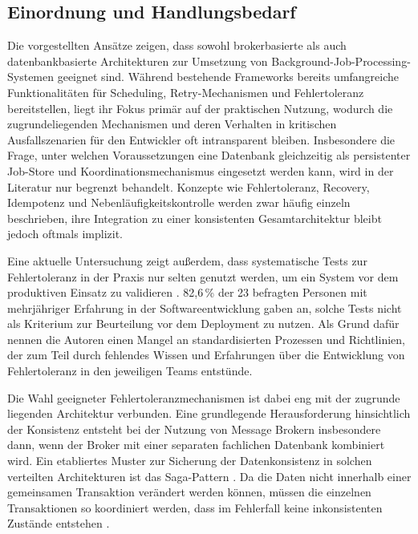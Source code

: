 \subsection{Einordnung und Handlungsbedarf}
\label{subsec:forschungsluecke}
Die vorgestellten Ansätze zeigen, dass sowohl brokerbasierte als auch datenbankbasierte Architekturen zur Umsetzung von
Background-Job-Processing-Systemen geeignet sind.
Während bestehende Frameworks bereits umfangreiche Funktionalitäten für Scheduling, Retry-Mechanismen und Fehlertoleranz
bereitstellen, liegt ihr Fokus primär auf der praktischen Nutzung, wodurch die zugrundeliegenden Mechanismen
und deren Verhalten in kritischen Ausfallszenarien für den Entwickler oft intransparent bleiben.
Insbesondere die Frage, unter welchen Voraussetzungen eine Datenbank gleichzeitig als persistenter Job-Store und
Koordinationsmechanismus eingesetzt werden kann, wird in der Literatur nur begrenzt behandelt.
Konzepte wie Fehlertoleranz, Recovery, Idempotenz und Nebenläufigkeitskontrolle werden zwar häufig einzeln beschrieben,
ihre Integration zu einer konsistenten Gesamtarchitektur bleibt jedoch oftmals implizit.

Eine aktuelle Untersuchung zeigt außerdem, dass systematische Tests zur Fehlertoleranz in der Praxis nur selten genutzt werden,
um ein System vor dem produktiven Einsatz zu validieren \parencite{miranda_proposed_2024}.
82,6\,\% der 23 befragten Personen mit mehrjähriger Erfahrung in der Softwareentwicklung gaben an, solche Tests nicht als
Kriterium zur Beurteilung vor dem Deployment zu nutzen.
Als Grund dafür nennen die Autoren einen Mangel an standardisierten Prozessen und Richtlinien, der zum Teil durch fehlendes
Wissen und Erfahrungen über die Entwicklung von Fehlertoleranz in den jeweiligen Teams entstünde.

Die Wahl geeigneter Fehlertoleranzmechanismen ist dabei eng mit der zugrunde liegenden Architektur verbunden.
Eine grundlegende Herausforderung hinsichtlich der Konsistenz entsteht bei der Nutzung von Message Brokern
insbesondere dann, wenn der Broker mit einer separaten fachlichen Datenbank kombiniert wird.
Ein etabliertes Muster zur Sicherung der Datenkonsistenz in solchen verteilten Architekturen ist das Saga-Pattern \parencite{miranda_proposed_2024}.
Da die Daten nicht innerhalb einer gemeinsamen Transaktion verändert werden können, müssen die einzelnen Transaktionen so
koordiniert werden, dass im Fehlerfall keine inkonsistenten Zustände entstehen \parencite[Kap.~4]{richardson_microservices_2018}.


